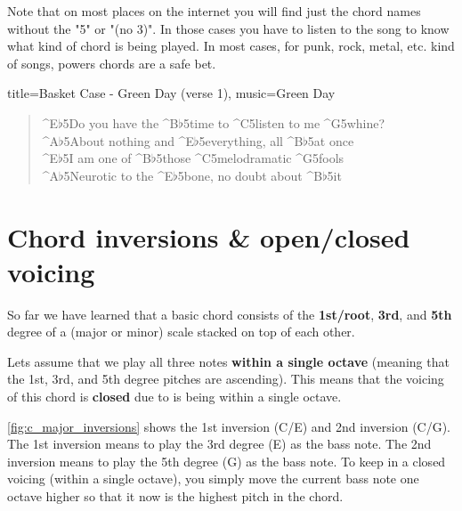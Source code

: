 Note that on most places on the internet you will find just the chord names without the "5" or "(no 3)". In those cases you have to listen to the song to know what kind of chord is being played. In most cases, for punk, rock, metal, etc. kind of songs, powers chords are a safe bet.

\begin{song}[verse/numbered, align-chords=l]{title={Basket Case - Green Day (verse 1)}, music={Green Day}}
	\begin{verse}
		^{E$\flat$5}Do you have the ^{B$\flat$5}time to ^{C5}listen to me ^{G5}whine? \\
		^{A$\flat$5}About nothing and ^{E$\flat$5}everything, all ^{B$\flat$5}at once \\
		^{E$\flat$5}I am one of ^{B$\flat$5}those ^{C5}melodramatic ^{G5}fools \\
		^{A$\flat$5}Neurotic to the ^{E$\flat$5}bone, no doubt about ^{B$\flat$5}it \\
	\end{verse}
\end{song}

\newpage

\section{Chord inversions \& open/closed voicing}

So far we have learned that a basic chord consists of the \textbf{1st/root}, \textbf{3rd}, and \textbf{5th} degree of a (major or minor) scale stacked on top of each other.

Lets assume that we play all three notes\textbf{ within a single octave} (meaning that the 1st, 3rd, and 5th degree pitches are ascending). This means that the voicing of this chord is \textbf{closed} due to is being within a single octave.

\autoref{fig:c_major_inversions} shows the 1st inversion (C/E) and 2nd inversion (C/G). The 1st inversion means to play the 3rd degree (E) as the bass note. The 2nd inversion means to play the 5th degree (G) as the bass note. To keep in a closed voicing (within a single octave), you simply move the current bass note one octave higher so that it now is the highest pitch in the chord.


